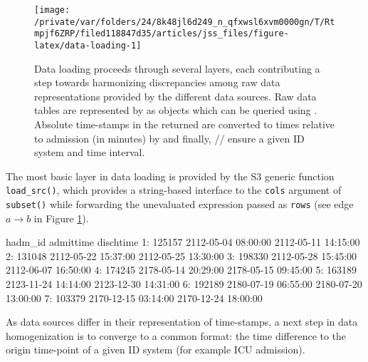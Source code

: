 \documentclass[
  notitle,
  nojss,
  noheadings]{jss}
\begin{document}
\begin{CodeChunk}
\begin{figure}

{\centering \texttt{[image: /private/var/folders/24/8k48jl6d249\_n\_qfxwsl6xvm0000gn/T/Rtmpjf6ZRP/filed118847d35/articles/jss\_files/figure-latex/data-loading-1]} 

}

\caption{Data loading proceeds through several layers, each contributing a step towards harmonizing discrepancies among raw data representations provided by the different data sources. Raw data tables are represented by  as  objects which can be queried using . Absolute time-stamps in the returned  are converted to times relative to admission (in minutes) by  and finally, /\allowbreak{}/\allowbreak{} ensure a given ID system and time interval.}\label{fig:data-loading}
\end{figure}
\end{CodeChunk}

The most basic layer in data loading is provided by the S3 generic
function \texttt{load\_src()}, which provides a string-based interface
to the \texttt{cols} argument of \texttt{subset()} while forwarding the
unevaluated expression passed as \texttt{rows} (see edge \(a \to b\) in
Figure \ref{fig:data-loading}).

\begin{CodeChunk}
\begin{CodeOutput}
   hadm_id           admittime           dischtime
1:  125157 2112-05-04 08:00:00 2112-05-11 14:15:00
2:  131048 2112-05-22 15:37:00 2112-05-25 13:30:00
3:  198330 2112-05-28 15:45:00 2112-06-07 16:50:00
4:  174245 2178-05-14 20:29:00 2178-05-15 09:45:00
5:  163189 2123-11-24 14:14:00 2123-12-30 14:31:00
6:  192189 2180-07-19 06:55:00 2180-07-20 13:00:00
7:  103379 2170-12-15 03:14:00 2170-12-24 18:00:00
\end{CodeOutput}
\end{CodeChunk}

As data sources differ in their representation of time-stamps, a next
step in data homogenization is to converge to a common format: the time
difference to the origin time-point of a given ID system (for example
ICU admission).
\end{document}
